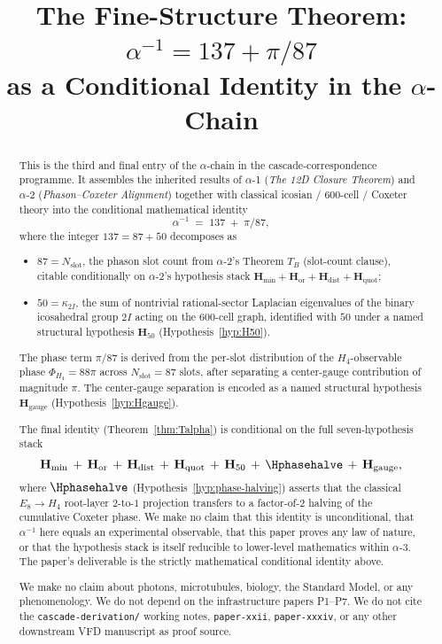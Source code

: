 \documentclass[11pt, a4paper]{amsart}
\title{The Fine-Structure Theorem:\\
  $\alpha^{-1} = 137 + \pi/87$\\
  as a Conditional Identity in the $\alpha$-Chain}
\author{}
\date{}
\theoremstyle{definition}
\newcommand{\Hmin}{\mathbf{H}_{\min}}
\newcommand{\Hor}{\mathbf{H}_{\mathrm{or}}}
\newcommand{\Hdist}{\mathbf{H}_{\mathrm{dist}}}
\newcommand{\Hquot}{\mathbf{H}_{\mathrm{quot}}}
\newcommand{\Hfifty}{\mathbf{H}_{50}}
\newcommand{\Hgauge}{\mathbf{H}_{\mathrm{gauge}}}
\newcommand{\Nslot}{N_{\mathrm{slot}}}
\newcommand{\kappaTwoI}{\kappa_{2I}}
\newcommand{\PhiHfour}{\Phi_{H_4}}
\begin{document}
\maketitle

\begin{abstract}
This is the third and final entry of the $\alpha$-chain in
the cascade-correspondence programme. It assembles the
inherited results of $\alpha$-1 (\emph{The 12D Closure
Theorem}) and $\alpha$-2 (\emph{Phason--Coxeter Alignment})
together with classical icosian / 600-cell / Coxeter theory
into the conditional mathematical identity
\[
  \alpha^{-1} \;=\; 137 \;+\; \pi/87,
\]
where the integer $137 = 87 + 50$ decomposes as
\begin{itemize}
\item $87 = \Nslot$, the phason slot count from $\alpha$-2's
  Theorem $T_B$ (slot-count clause), citable conditionally on
  $\alpha$-2's hypothesis stack
  $\Hmin + \Hor + \Hdist + \Hquot$;
\item $50 = \kappaTwoI$, the sum of nontrivial rational-sector
  Laplacian eigenvalues of the binary icosahedral group $2I$
  acting on the $600$-cell graph, identified with $50$ under
  a named structural hypothesis $\Hfifty$
  (Hypothesis~\ref{hyp:H50}).
\end{itemize}
The phase term $\pi/87$ is derived from the per-slot
distribution of the $H_4$-observable phase
$\PhiHfour = 88\pi$ across $\Nslot = 87$ slots, after
separating a center-gauge contribution of magnitude $\pi$.
The center-gauge separation is encoded as a named structural
hypothesis $\Hgauge$ (Hypothesis~\ref{hyp:Hgauge}).

The final identity (Theorem~\ref{thm:Talpha}) is conditional
on the full seven-hypothesis stack
\[
  \Hmin \,+\, \Hor \,+\, \Hdist \,+\, \Hquot \,+\,
  \Hfifty \,+\, \Hphasehalve \,+\, \Hgauge,
\]
where $\Hphasehalve$ (Hypothesis~\ref{hyp:phase-halving})
asserts that the classical $E_8 \to H_4$ root-layer $2$-to-$1$
projection transfers to a factor-of-$2$ halving of the
cumulative Coxeter phase.
We make no claim that this identity is unconditional, that
$\alpha^{-1}$ here equals an experimental observable, that
this paper proves any law of nature, or that the
hypothesis stack is itself reducible to lower-level
mathematics within $\alpha$-3. The paper's deliverable is
the strictly mathematical conditional identity above.

We make no claim about photons, microtubules, biology, the
Standard Model, or any phenomenology. We do not depend on the
infrastructure papers P1--P7. We do not cite the
\texttt{cascade-derivation/} working notes,
\texttt{paper-xxii}, \texttt{paper-xxxiv}, or any other
downstream VFD manuscript as proof source.
\end{abstract}
\end{document}
